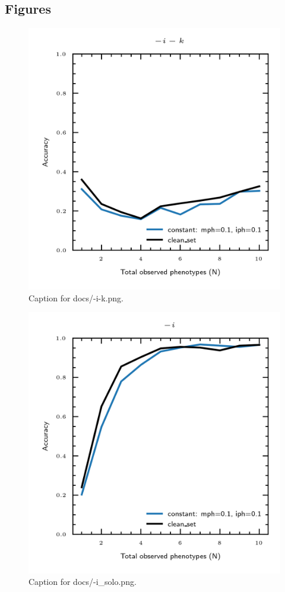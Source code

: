 \documentclass{article}
\begin{document}
\subsection{Figures}
\begin{figure}[h] \centering \includegraphics{docs/-i-k.png} \caption{Caption for docs/-i-k.png.} \end{figure}
\begin{figure}[h] \centering \includegraphics{docs/-i_solo.png} \caption{Caption for docs/-i_solo.png.} \end{figure}
\end{document}
